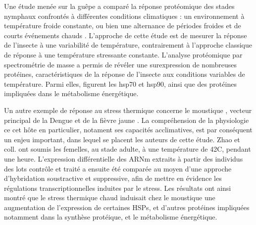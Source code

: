 		Une étude menée sur la guêpe  a comparé la réponse protéomique des stades nymphaux confrontés à différentes conditions climatiques : un environnement à température froide constante, ou bien une alternance de périodes froides et de courts événements chauds \cite{colinet2007}.
		L'approche de cette étude est de mesurer la réponse de l'insecte à une variabilité de température, contrairement à l'approche classique de réponse à une température stressante constante. 
		L'analyse protéomique par spectrométrie de masse a  permis de révéler une surexpression de nombreuses protéines, caractéristiques de la réponse de l'insecte aux conditions variables de température. Parmi elles, figurent les hsp70 et hsp90,
		ainsi que des protéines impliquées dans le métabolisme énergétique.


		Un autre exemple de réponse au stress thermique concerne le moustique , vecteur principal de la Dengue et de la fièvre jaune \cite{zhao2009}.
		La compréhension de la physiologie ce cet hôte en particulier, notament ses capacités acclimatives, est par conséquent un enjeu important, dans lequel se placent les auteurs de cette étude. 
		Zhao et coll. ont soumis les femelles, au stade adulte, à une température de 42\textdegree{}C, pendant une heure.
		L'expression différentielle des ARNm extraits à partir des individus des lots contrôle et traité a ensuite été comparée au moyen d'une approche d'hybridation soustractive et suppressive, afin de mettre en évidence les régulations transcriptionnelles induites par le stress.
		Les résultats ont ainsi montré que le stress thermique chaud induisait chez le moustique
		une augmentation de l'expression de certaines HSPs, et d'autres protéines impliquées notamment dans la synthèse protéique, et le métabolisme énergétique.

